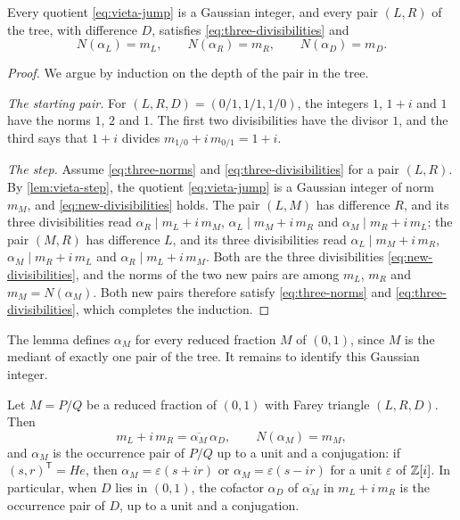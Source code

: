 \begin{lemma}\label{lem:three-divisibilities}
Every quotient \eqref{eq:vieta-jump} is a Gaussian integer, and every pair
$(L,R)$ of the tree, with difference $D$, satisfies
\eqref{eq:three-divisibilities} and
\begin{equation}\label{eq:three-norms}
 N(\alpha_L)=m_L,\qquad N(\alpha_R)=m_R,\qquad N(\alpha_D)=m_D.
\end{equation}
\end{lemma}

\begin{proof}
We argue by induction on the depth of the pair in the tree.

\emph{The starting pair.} For $(L,R,D)=(0/1,1/1,1/0)$, the integers $1$, $1+i$
and $1$ have the norms $1$, $2$ and $1$. The first two divisibilities have
the divisor $1$, and the third says that $1+i$ divides
$m_{1/0}+i\,m_{0/1}=1+i$.

\emph{The step.} Assume \eqref{eq:three-norms} and
\eqref{eq:three-divisibilities} for a pair $(L,R)$. By \cref{lem:vieta-step},
the quotient \eqref{eq:vieta-jump} is a Gaussian integer of norm $m_M$, and
\eqref{eq:new-divisibilities} holds. The pair $(L,M)$ has difference $R$, and
its three divisibilities read $\alpha_R\mid m_L+i\,m_M$, $\alpha_L\mid m_M+i\,m_R$
and $\alpha_M\mid m_R+i\,m_L$; the pair $(M,R)$ has difference $L$, and its
three divisibilities read $\alpha_L\mid m_M+i\,m_R$, $\alpha_M\mid m_R+i\,m_L$ and
$\alpha_R\mid m_L+i\,m_M$. Both are the three divisibilities
\eqref{eq:new-divisibilities}, and the norms of the two new pairs are among
$m_L$, $m_R$ and $m_M=N(\alpha_M)$. Both new pairs therefore satisfy
\eqref{eq:three-norms} and \eqref{eq:three-divisibilities}, which completes the
induction.
\end{proof}

The lemma defines $\alpha_M$ for every reduced fraction $M$ of $(0,1)$, since
$M$ is the mediant of exactly one pair of the tree. It remains to identify
this Gaussian integer.

\begin{proposition}\label{prop:vieta-jump}
Let $M=P/Q$ be a reduced fraction of $(0,1)$ with Farey triangle $(L,R,D)$.
Then
\begin{equation}\label{eq:vieta-product}
 m_L+i\,m_R=\overline{\alpha_M}\,\alpha_D,\qquad N(\alpha_M)=m_M,
\end{equation}
and $\alpha_M$ is the occurrence pair of $P/Q$ up to a unit and a conjugation:
if $(s,r)^{\mathsf T}=He$, then $\alpha_M=\varepsilon(s+ir)$ or
$\alpha_M=\varepsilon(s-ir)$ for a unit $\varepsilon$ of $\mathbb{Z}[i]$. In particular, when
$D$ lies in $(0,1)$, the cofactor $\alpha_D$ of $\overline{\alpha_M}$ in
$m_L+i\,m_R$ is the occurrence pair of $D$, up to a unit and a conjugation.
\end{proposition}

